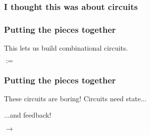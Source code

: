 \begin{frame}
    \frametitle{I thought this was about circuits}

    \centering

    \pause
    \pause\quad
    \pause\quad

    \vspace{1em}

    \pause
    \pause\quad
    \pause\quad
    \pause\quad

\end{frame}
\begin{frame}
    \frametitle{Putting the pieces together}

    \centering
    \LARGE
    This lets us build \alert{combinational} circuits.

    \vspace{1em}
    \normalsize
    \quad\(:=\)\quad

\end{frame}
\begin{frame}
    \frametitle{Putting the pieces together}

    \centering
    \LARGE
    These circuits are \alert{boring}!
    \pause
    Circuits need \alert{state}...

    \normalsize
    \vspace{1em}

    \pause
    \pause\quad
    \pause\quad
    \pause\quad

    \pause
    \vspace{1em}

    \LARGE
    ...and \alert{feedback}!
    \normalsize

    \vspace{1em}
    \pause

    \pause
    \quad\(\rightarrow\)\quad
\end{frame}